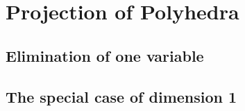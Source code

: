 \documentclass[main]{subfiles}
\begin{document}

\section{Projection of Polyhedra}

\subsection{Elimination of one variable}

\subsection{The special case of dimension 1}
\end{document}
